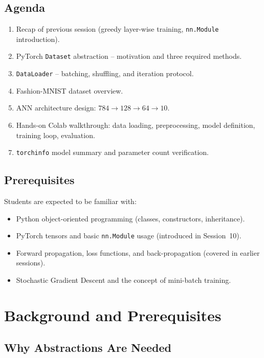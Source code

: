 \documentclass[12pt,a4paper]{article}
\begin{document}
\subsection{Agenda}

\begin{enumerate}[label=\arabic*.]
  \item Recap of previous session (greedy layer-wise training, \texttt{nn.Module} introduction).
  \item PyTorch \texttt{Dataset} abstraction -- motivation and three required methods.
  \item \texttt{DataLoader} -- batching, shuffling, and iteration protocol.
  \item Fashion-MNIST dataset overview.
  \item ANN architecture design: $784 \to 128 \to 64 \to 10$.
  \item Hands-on Colab walkthrough: data loading, preprocessing, model definition, training loop, evaluation.
  \item \texttt{torchinfo} model summary and parameter count verification.
\end{enumerate}

\subsection{Prerequisites}

Students are expected to be familiar with:
\begin{itemize}
  \item Python object-oriented programming (classes, constructors, inheritance).
  \item PyTorch tensors and basic \texttt{nn.Module} usage (introduced in Session~10).
  \item Forward propagation, loss functions, and back-propagation (covered in earlier sessions).
  \item Stochastic Gradient Descent and the concept of mini-batch training.
\end{itemize}

\section{Background and Prerequisites}
\label{sec:background}

\subsection{Why Abstractions Are Needed}
\end{document}
